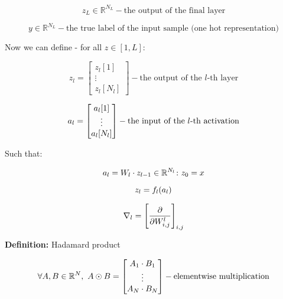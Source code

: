 \begin{equation}
    z_L \in \mathbb{R}^{N_L} - \text{the output of the final layer}
\end{equation}

\begin{equation}
    y \in \mathbb{R}^{N_L} - \text{the true label of the input sample (one hot representation)}
\end{equation}

Now we can define - for all \( z \in [1, L] \):

\begin{equation} \label{eq:backprop_def}
    z_l = \begin{bmatrix} z_l[1] \\ \vdots \\ z_l[N_l] \end{bmatrix} - \text{the output of the \(l\)-th layer}
\end{equation}

\begin{equation} \notag
    a_l = \begin{bmatrix} a_l[1] \\ \vdots \\ a_l[N_l] \end{bmatrix} - \text{the input of the \(l\)-th activation}
\end{equation}

Such that:

\begin{equation} \notag
    a_l = W_l \cdot z_{l-1} \in \mathbb{R}^{N_l} \colon z_0 = x
\end{equation}

\begin{equation} \notag
    z_l = f_l(a_l)
\end{equation}

\begin{equation} \notag
    \nabla_l = \left[ \frac{\partial}{\partial W_{i,j}^l} \right]_{i,j}
\end{equation}

\begin{mdframed}[backgroundcolor=gray_background, linewidth=0pt]
    \textbf{Definition:} Hadamard product

    \begin{equation} \notag
        \forall A, B \in \mathbb{R}^N, \ A \odot B = \begin{bmatrix} A_1 \cdot B_1 \\ \vdots \\     A_N \cdot B_N \end{bmatrix} - \text{elementwise multiplication}
    \end{equation}
    
\end{mdframed}